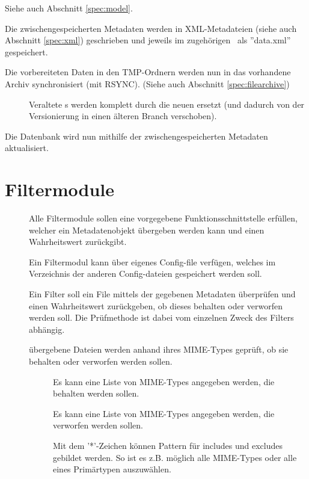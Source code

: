 \begin{description}
		Siehe auch Abschnitt \ref{spec:model}.
	\item [\req{Erzeugung von XML-Dateien}{xml}]
		Die zwischengespeicherten Metadaten werden in XML-Metadateien 
		(siehe auch Abschnitt \ref{spec:xml}) 
		geschrieben und jeweils im zugehörigen \arc\ als ''data.xml'' gespeichert. 
	\item [\req{Synchronisation}{sync}]
		Die vorbereiteten Daten in den TMP-Ordnern werden nun in das vorhandene Archiv synchronisiert 
		(mit RSYNC). (Siehe auch Abschnitt \ref{spec:filearchive})
		\begin{description}
			\item []
				Veraltete \arc s werden komplett durch die neuen ersetzt
				(und dadurch von der Versionierung in einen älteren Branch verschoben).
		\end{description}
	\item [\req{Datenbankaktualisierung}{dbupdate}]
		Die Datenbank wird nun mithilfe der zwischengespeicherten Metadaten aktualisiert.
\end{description}

\section{Filtermodule}
\begin{description}
	\item []
		Alle Filtermodule sollen eine vorgegebene Funktionsschnittstelle erfüllen, 
		welcher ein Metadatenobjekt übergeben werden kann und einen Wahrheitswert zurückgibt.
	\item []
		Ein Filtermodul kann über eigenes Config-file verfügen, welches im Verzeichnis
		der anderen Config-dateien gespeichert werden soll.
	\item []
		Ein Filter soll ein File mittels der gegebenen Metadaten überprüfen und 
		einen Wahrheitswert zurückgeben,
		ob dieses behalten oder verworfen werden soll.
		Die Prüfmethode ist dabei vom einzelnen Zweck des Filters abhängig.
	\item []
		übergebene Dateien werden anhand ihres MIME-Types geprüft, ob sie behalten oder verworfen werden sollen.
		\begin{description}
			\item []
				Es kann eine Liste von MIME-Types angegeben werden, die behalten werden sollen. 
			\item []
				Es kann eine Liste von MIME-Types angegeben werden, die verworfen werden sollen. 
			\item []
				Mit dem '*'-Zeichen können Pattern für includes und excludes gebildet werden. 
				So ist es z.B. möglich alle MIME-Types oder alle eines Primärtypen auszuwählen.
		\end{description}
\end{description}


